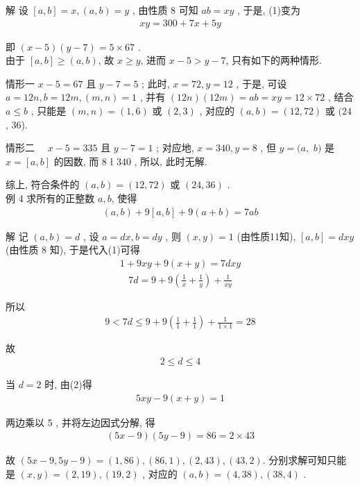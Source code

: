 解 设 $[a, b]=x,(a, b)=y$ , 由性质 8 可知 $a b=x y$ , 于是, (1)变为
\begin{align*}
	x y=300+7 x+5 y
\end{align*}

即 $(x-5)(y-7)=5 \times 67$ . \\
由于 $[a, b] \geqslant(a, b)$, 故 $x \geqslant y$, 进而 $x-5>y-7$, 只有如下的两种情形.

情形一 $x-5=67$ 且 $y-7=5$ ; 此时,  $x=72, y=12$ , 于是, 可设 $a=12 n ,  b=12 m , (m, n)=1$ , 并有 $(12 n)(12 m)=a b=x y=12 \times 72$ , 结合 $a \leqslant b$ , 只能是 $(m, n)=(1,6)$ 或 $(2,3)$ , 对应的 $(a, b)=(12,72)$ 或 $(24$ ,  36).

情形二 $\quad x-5=335$ 且 $y-7=1$ ; 对应地,  $x=340, y=8$ , 但 $y=(a , $ $b )$ 是 $x=[a, b]$ 的因数, 而 8 ł 340 , 所以, 此时无解.

综上, 符合条件的 $(a, b)=(12,72)$ 或 $(24,36)$ . \\
例 4 求所有的正整数 $a ,  b$, 使得
\begin{align*}
	(a, b)+9[a, b]+9(a+b)=7 a b
\end{align*}

解 记 $(a, b)=d$ , 设 $a=d x, b=d y$ , 则 $(x, y)=1$ (由性质11知),  $[a, b]=d x y$ (由性质 8 知), 于是代入(1)可得
\begin{align*}
	1+9 x y+9(x+y)=7 d x y
\end{align*}
\begin{align*}
	7 d=9+9\left(\frac{1}{x}+\frac{1}{y}\right)+\frac{1}{x y}
\end{align*}

所以
\begin{align*}
	9<7 d \leqslant 9+9\left(\frac{1}{1}+\frac{1}{1}\right)+\frac{1}{1 \times 1}=28
\end{align*}

故
\begin{align*}
	2 \leqslant d \leqslant 4
\end{align*}

当 $d=2$ 时, 由(2)得
\begin{align*}
	5 x y-9(x+y)=1
\end{align*}

两边乘以 5 , 并将左边因式分解, 得
\begin{align*}
	(5 x-9)(5 y-9)=86=2 \times 43
\end{align*}

故 $(5 x-9,5 y-9)=(1,86) , (86,1),(2,43) , (43,2)$. 分别求解可知只能是 $(x, y)=(2,19),(19,2)$ , 对应的 $(a, b)=(4,38),(38,4)$ .

